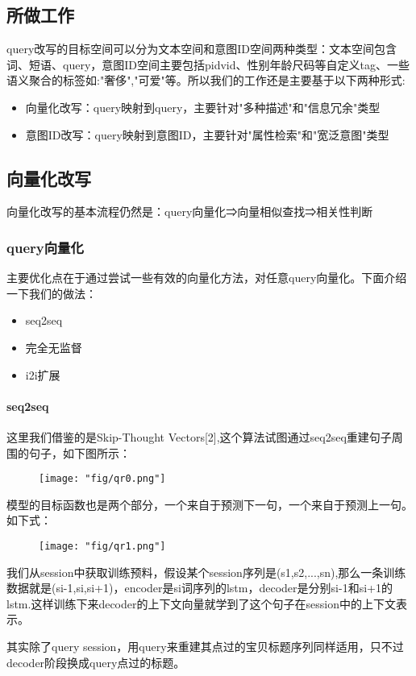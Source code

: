 \subsection{所做工作}
query改写的目标空间可以分为文本空间和意图ID空间两种类型：文本空间包含词、短语、query，意图ID空间主要包括pidvid、性别年龄尺码等自定义tag、一些语义聚合的标签如:"奢侈","可爱"等。所以我们的工作还是主要基于以下两种形式:
\begin{itemize}
\item 向量化改写：query映射到query，主要针对"多种描述"和"信息冗余"类型
\item 意图ID改写：query映射到意图ID，主要针对"属性检索"和"宽泛意图"类型
\end{itemize}
\subsection{向量化改写}
向量化改写的基本流程仍然是：query向量化⇒向量相似查找⇒相关性判断

\subsubsection{query向量化}
主要优化点在于通过尝试一些有效的向量化方法，对任意query向量化。下面介绍一下我们的做法：
\begin{itemize}
\item seq2seq
\item 完全无监督
\item i2i扩展
\end{itemize}
\paragraph{seq2seq}
这里我们借鉴的是Skip-Thought Vectors[2],这个算法试图通过seq2seq重建句子周围的句子，如下图所示：
\begin{figure}[!h]
	\centering
	\texttt{[image: "fig/qr0.png"]}
	\caption{}
	\label{fig:qr0}
\end{figure}
模型的目标函数也是两个部分，一个来自于预测下一句，一个来自于预测上一句。如下式：
\begin{figure}[!h]
	\centering
	\texttt{[image: "fig/qr1.png"]}
	\caption{}
	\label{fig:qr1}
\end{figure}
我们从session中获取训练预料，假设某个session序列是(s1,s2,...,sn),那么一条训练数据就是(si-1,si,si+1)，encoder是si词序列的lstm，decoder是分别si-1和si+1的lstm.这样训练下来decoder的上下文向量就学到了这个句子在session中的上下文表示。
\par 其实除了query session，用query来重建其点过的宝贝标题序列同样适用，只不过decoder阶段换成query点过的标题。

